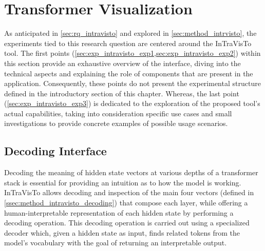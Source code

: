 \section{Transformer Visualization}\label{sec:exp_intravisto}

As anticipated in \cref{sec:rq_intravisto} and explored in \cref{sec:method_intrvisto}, the experiments tied to this research question are centered around the InTraVisTo tool.
The first points (\cref{sec:exp_intravisto_exp1,sec:exp_intravisto_exp2}) within this section provide an exhaustive overview of the interface, diving into the technical aspects and explaining the role of components that are present in the application.
Consequently, these points do not present the experimental structure defined in the introductory section of this chapter.
Whereas, the last point (\cref{sec:exp_intravisto_exp3}) is dedicated to the exploration of the proposed tool's actual capabilities, taking into consideration specific use cases and small investigations to provide concrete examples of possible usage scenarios.

\subsection{Decoding Interface}\label{sec:exp_intravisto_exp1}

Decoding the meaning of hidden state vectors at various depths of a transformer stack is essential for providing an intuition as to how the model is working.
InTraVisTo allows decoding and inspection of the main four vectors (defined in \cref{ssec:method_intravisto_decoding}) that compose each layer, while offering a human-interpretable representation of each hidden state by performing a decoding operation.
This decoding operation is carried out using a specialized decoder which, given a hidden state as input, finds related tokens from the model's vocabulary with the goal of returning an interpretable output.

